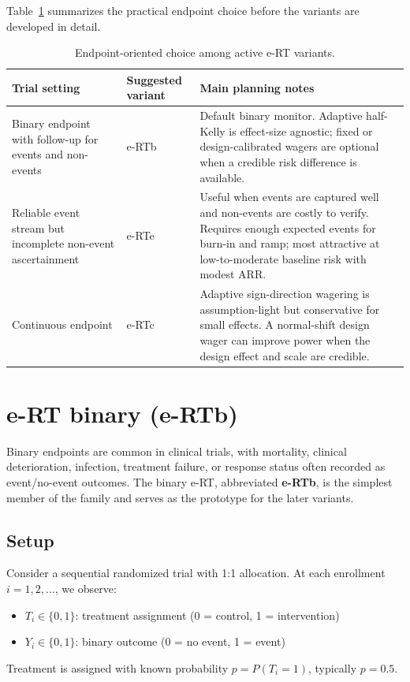 \documentclass[10pt]{article}
\begin{document}
Table~\ref{tab:variant_selection} summarizes the practical endpoint choice before the variants are developed in detail.

\begin{table}[htbp]
\centering
\small
\caption{Endpoint-oriented choice among active e-RT variants.}
\label{tab:variant_selection}
\begin{tabular}{p{}p{}p{}}
\toprule
Trial setting & Suggested variant & Main planning notes \\
\midrule
Binary endpoint with follow-up for events and non-events & e-RTb & Default binary monitor. Adaptive half-Kelly is effect-size agnostic; fixed or design-calibrated wagers are optional when a credible risk difference is available. \\
Reliable event stream but incomplete non-event ascertainment & e-RTe & Useful when events are captured well and non-events are costly to verify. Requires enough expected events for burn-in and ramp; most attractive at low-to-moderate baseline risk with modest ARR. \\
Continuous endpoint & e-RTc & Adaptive sign-direction wagering is assumption-light but conservative for small effects. A normal-shift design wager can improve power when the design effect and scale are credible. \\
\bottomrule
\end{tabular}
\end{table}

\section{e-RT binary (e-RTb)}

Binary endpoints are common in clinical trials, with mortality, clinical deterioration, infection, treatment failure, or response status often recorded as event/no-event outcomes. The binary e-RT, abbreviated \textbf{e-RTb}, is the simplest member of the family and serves as the prototype for the later variants.

\subsection{Setup}

Consider a sequential randomized trial with 1:1 allocation. At each enrollment $i = 1, 2, \ldots$, we observe:
\begin{itemize}
    \item $T_i \in \{0, 1\}$: treatment assignment (0 = control, 1 = intervention)
    \item $Y_i \in \{0, 1\}$: binary outcome (0 = no event, 1 = event)
\end{itemize}
Treatment is assigned with known probability $p = P(T_i = 1)$, typically $p = 0.5$.
\end{document}
